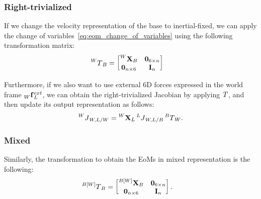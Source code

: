 \subsubsection{Right-trivialized}

If we change the velocity representation of the base to inertial-fixed, we can apply the change of variables~\eqref{eq:eom_change_of_variables} using the following transformation matrix:
%
\begin{align*}
    \transrepr[W]_B &=
    \begin{bmatrix}
        \transvel[W]_B & \zeros_{6\times n} \\
        \zeros_{n\times6} & \eye_n
    \end{bmatrix}
\end{align*}

Furthermore, if we also want to use external 6D forces expressed in the world frame $\forcesix[W]_L^{ext}$, we can obtain the right-trivialized Jacobian by applying $\transrepr$, and then update its output representation as follows:
%
\begin{align*}
    \jac[W]_{W,L/W} = \transvel[W]_L \jac[L]_{W,L/B} \transrepr[B]_W
    .
\end{align*}

\subsubsection{Mixed}

Similarly, the transformation to obtain the \acp{EoM} in mixed representation is the following:
%
\begin{align*}
    \transrepr[{B[W]}]_B &=
    \begin{bmatrix}
        \transvel[{B[W]}]_B & \zeros_{6\times n} \\
        \zeros_{n\times6} & \eye_n
    \end{bmatrix}
    .
\end{align*}
